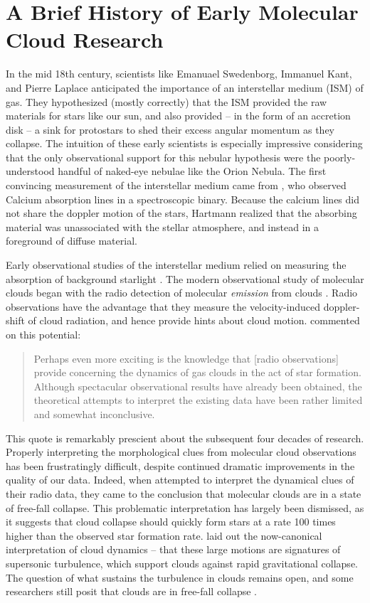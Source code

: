 
\section{A Brief History of Early Molecular Cloud Research}

In the mid 18th century, scientists like Emanuael Swedenborg, Immanuel Kant, and Pierre Laplace anticipated the importance of an interstellar medium (ISM) of gas. They hypothesized (mostly correctly) that the ISM provided the raw materials for stars like our sun, and also provided -- in the form of an accretion disk -- a sink for protostars to shed their excess angular momentum as they collapse. The intuition of these early scientists is especially impressive considering that the only observational support for this nebular hypothesis were the poorly-understood handful of naked-eye nebulae like the Orion Nebula. The first convincing measurement of the interstellar medium came from \cite{Hartmann04}, who observed Calcium absorption lines in a spectroscopic binary. Because the calcium lines did not share the doppler motion of the stars, Hartmann realized that the absorbing material was unassociated with the stellar atmosphere, and instead in a foreground of diffuse material.

Early observational studies of the interstellar medium relied on measuring the absorption of background starlight \citep{Barnard19, Bates51}. The modern observational study of molecular clouds began with the radio detection of molecular \textit{emission} from clouds \citep{Gundermann65, Palmer67, Wilson70}. Radio observations have the advantage that they measure the velocity-induced doppler-shift of cloud radiation, and hence provide hints about cloud motion. \cite{Goldreich74} commented on this potential:

\blockquote{Perhaps even more exciting is the knowledge that [radio observations] provide concerning the dynamics of gas clouds in the act of star formation. Although spectacular observational results have already been obtained, the theoretical attempts to interpret the existing data have been rather limited and somewhat inconclusive.}

This quote is remarkably prescient about the subsequent four decades of research. Properly interpreting the morphological clues from molecular cloud observations has been frustratingly difficult, despite continued dramatic improvements in the quality of our data. Indeed, when \cite{Goldreich74} attempted to interpret the dynamical clues of their radio data, they came to the conclusion that molecular clouds are in a state of free-fall collapse. This problematic interpretation has largely been dismissed, as it suggests that cloud collapse should quickly form stars at a rate 100 times higher than the observed star formation rate. \cite{Larson81} laid out the now-canonical interpretation of cloud dynamics -- that these large motions are signatures of supersonic turbulence, which support clouds against rapid gravitational collapse. The question of what sustains the turbulence in clouds remains open, and some researchers still posit that clouds are in free-fall collapse \citep{Vaz07}.

